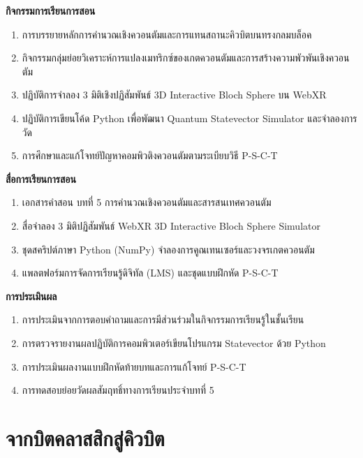 \begin{lessonplanbox}
\noindent\textbf{กิจกรรมการเรียนการสอน}
\begin{enumerate}
    \item การบรรยายหลักการคำนวณเชิงควอนตัมและการแทนสถานะคิวบิตบนทรงกลมบล็อค
    \item กิจกรรมกลุ่มย่อยวิเคราะห์การแปลงเมทริกซ์ของเกตควอนตัมและการสร้างความพัวพันเชิงควอนตัม
    \item ปฏิบัติการจำลอง 3 มิติเชิงปฏิสัมพันธ์ 3D Interactive Bloch Sphere บน WebXR
    \item ปฏิบัติการเขียนโค้ด Python เพื่อพัฒนา Quantum Statevector Simulator และจำลองการวัด
    \item การศึกษาและแก้โจทย์ปัญหาคอมพิวติงควอนตัมตามระเบียบวิธี P-S-C-T
\end{enumerate}

\noindent\textbf{สื่อการเรียนการสอน}
\begin{enumerate}
    \item เอกสารคำสอน บทที่ 5 การคำนวณเชิงควอนตัมและสารสนเทศควอนตัม
    \item สื่อจำลอง 3 มิติปฏิสัมพันธ์ WebXR 3D Interactive Bloch Sphere Simulator
    \item ชุดสคริปต์ภาษา Python (NumPy) จำลองการคูณเทนเซอร์และวงจรเกตควอนตัม
    \item แพลตฟอร์มการจัดการเรียนรู้ดิจิทัล (LMS) และชุดแบบฝึกหัด P-S-C-T
\end{enumerate}

\noindent\textbf{การประเมินผล}
\begin{enumerate}
    \item การประเมินจากการตอบคำถามและการมีส่วนร่วมในกิจกรรมการเรียนรู้ในชั้นเรียน
    \item การตรวจรายงานผลปฏิบัติการคอมพิวเตอร์เขียนโปรแกรม Statevector ด้วย Python
    \item การประเมินผลงานแบบฝึกหัดท้ายบทและการแก้โจทย์ P-S-C-T
    \item การทดสอบย่อยวัดผลสัมฤทธิ์ทางการเรียนประจำบทที่ 5
\end{enumerate}
\end{lessonplanbox}
\newpage

\section{จากบิตคลาสสิกสู่คิวบิต}

